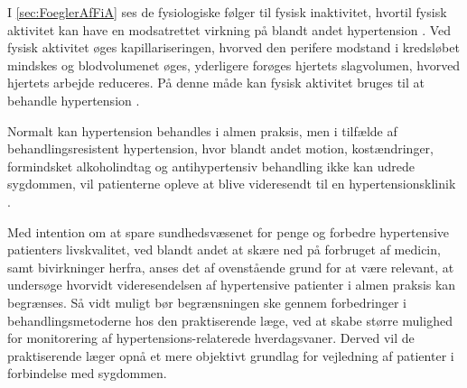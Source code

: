 I \autoref{sec:FoeglerAfFiA} ses de fysiologiske følger til fysisk inaktivitet, hvortil fysisk aktivitet kan have en modsatrettet virkning på blandt andet hypertension \citep{pedersen2011}. Ved fysisk aktivitet øges kapillariseringen, hvorved den perifere modstand i kredsløbet mindskes og blodvolumenet øges, yderligere forøges hjertets slagvolumen, hvorved hjertets arbejde reduceres. På denne måde kan fysisk aktivitet bruges til at behandle hypertension \citep{andersen2001}.

Normalt kan hypertension behandles i almen praksis, men i tilfælde af behandlingsresistent hypertension, hvor blandt andet motion, kostændringer, formindsket alkoholindtag og antihypertensiv behandling ikke kan udrede sygdommen, vil patienterne opleve at blive videresendt til en hypertensionsklinik \cite{lodberg2016, bech2015}.

Med intention om at spare sundhedsvæsenet for penge og forbedre hypertensive patienters livskvalitet, ved blandt andet at skære ned på forbruget af medicin, samt bivirkninger herfra, anses det af ovenstående grund for at være relevant, at undersøge hvorvidt videresendelsen af hypertensive patienter i almen praksis kan begrænses. Så vidt muligt bør begrænsningen ske gennem forbedringer i behandlingsmetoderne hos den praktiserende læge, ved at skabe større mulighed for monitorering af hypertensions-relaterede hverdagsvaner. Derved vil de praktiserende læger opnå et mere objektivt grundlag for vejledning af patienter i forbindelse med sygdommen.